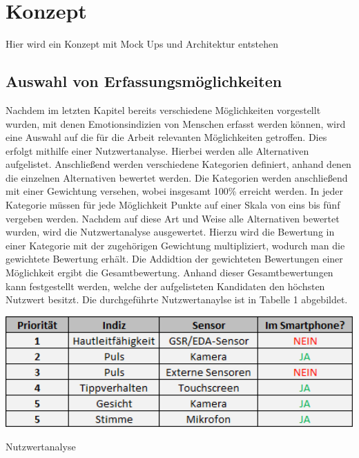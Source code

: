 \section{Konzept}
Hier wird ein Konzept mit Mock Ups und Architektur entstehen

\subsection{Auswahl von Erfassungsmöglichkeiten}
Nachdem im letzten Kapitel bereits verschiedene Möglichkeiten vorgestellt wurden, mit denen Emotionsindizien von Menschen erfasst werden können, wird eine Auswahl auf die für die Arbeit relevanten Möglichkeiten getroffen. Dies erfolgt mithilfe einer Nutzwertanalyse. \newline
Hierbei werden alle Alternativen aufgelistet. Anschließend werden verschiedene Kategorien definiert, anhand denen die einzelnen Alternativen bewertet werden. Die Kategorien werden anschließend mit einer Gewichtung versehen, wobei insgesamt 100\% erreicht werden. In jeder Kategorie müssen für jede Möglichkeit Punkte auf einer Skala von eins bis fünf vergeben werden. Nachdem auf diese Art und Weise alle Alternativen bewertet wurden, wird die Nutzwertanalyse ausgewertet. Hierzu wird die Bewertung in einer Kategorie mit der zugehörigen Gewichtung multipliziert, wodurch man die gewichtete Bewertung erhält. Die Addidtion der gewichteten Bewertungen einer Möglichkeit ergibt die Gesamtbewertung. Anhand dieser Gesamtbewertungen kann festgestellt werden, welche der aufgelisteten Kandidaten den höchsten Nutzwert besitzt. \newline
Die durchgeführte Nutzwertanaylse ist in Tabelle 1 abgebildet.
\begin{table}[h]
	\centering
	\includegraphics[width=14cm]{Bilder/prio.png}
	\caption[Nutzwertanalyse]{Nutzwertanalyse}
\end{table}%

